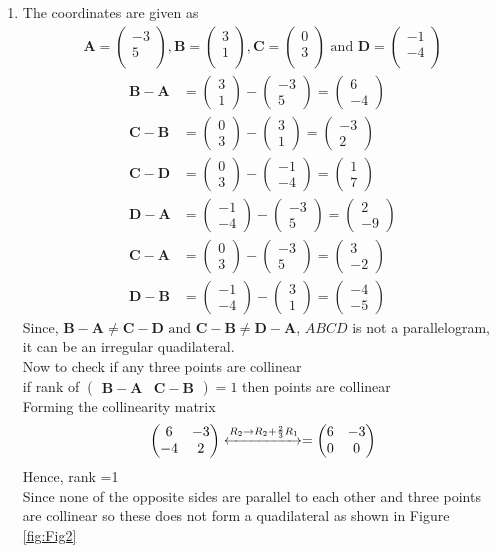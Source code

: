 \documentclass[12pt]{article}
\newcommand{\myvec}[1]{\ensuremath{\begin{pmatrix}#1\end{pmatrix}}}
\let\vec\mathbf
\begin{document}
\begin{enumerate}
\item The coordinates are given as
	\begin{align}
	\vec{A} = \myvec{
		-3\\
		5\\
		},
	\vec{B} = \myvec{
		3\\
		1\\
		},
	\vec{C} = \myvec{
		0\\
		3\\
		} \text{ and }
	\vec{D} = \myvec{
		-1\\
		-4\\
		}
	\end{align}
	\begin{align}
		\vec{B} - \vec{A} &= \myvec{3\\1} - \myvec{-3\\5} = \myvec{6\\-4}\\
		\vec{C} - \vec{B} &= \myvec{0\\3} - \myvec{3\\1} = \myvec{-3\\2}\\
		\vec{C} - \vec{D} &= \myvec{0\\3} - \myvec{-1\\-4} = \myvec{1\\7}\\
		\vec{D} - \vec{A} &= \myvec{-1\\-4} - \myvec{-3\\5} = \myvec{2\\-9}\\
		\vec{C} - \vec{A} &= \myvec{0\\3} - \myvec{-3\\5} = \myvec{3\\-2}\\
		\vec{D} - \vec{B} &= \myvec{-1\\-4} - \myvec{3\\1} = \myvec{-4\\-5}
	\end{align}
	Since, $\vec{B}-\vec{A} \neq \vec{C}-\vec{D} \text{ and } \vec{C}-\vec{B} \neq \vec{D}-\vec{A}$, $ABCD$ is not a parallelogram, it can be an irregular quadilateral.\\ 
	Now to check if any three points are collinear\\
	if rank of $\myvec{\vec{B}-\vec{A} & \vec{C}-\vec{B}} = 1$ then points are collinear\\
	Forming the collinearity matrix
	\begin{align}
		\myvec{6&-3\\-4&2} \xleftrightarrow{R_{2}\rightarrow R_{2}+\frac{2}{3}R_{1}}= \myvec{6&-3\\0&0}
	\end{align}
	Hence, rank =1\\
	Since none of the opposite sides are parallel to each other and three points are collinear so these does not form a quadilateral as shown in Figure \ref{fig:Fig2}\\
	

\end{enumerate}
\end{document}
